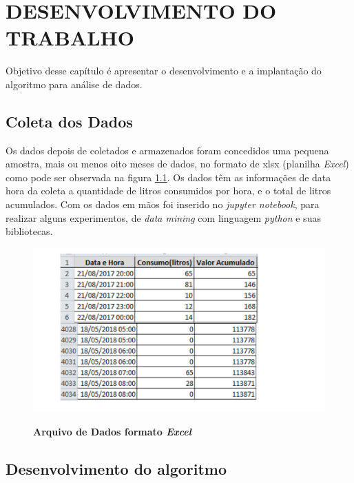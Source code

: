 	\newpage
\chapter{DESENVOLVIMENTO DO TRABALHO}

\par Objetivo desse capítulo é apresentar o desenvolvimento e a implantação do algoritmo para análise de dados.



\section{Coleta dos Dados}

\par Os dados depois de coletados e armazenados foram concedidos uma pequena amostra, mais ou menos oito meses de dados, no formato de xlsx (planilha \emph{Excel}) como pode ser observada na figura \ref{arquivo_de_dados}. Os dados têm  as informações de data hora da coleta a quantidade de litros consumidos por hora, e o total de litros acumulados. Com os dados em mãos foi inserido no \emph{jupyter notebook}, para realizar alguns experimentos, de \emph{data mining} com linguagem \emph{python} e suas bibliotecas.

\begin{figure}[ht]
	\caption{\textbf{Arquivo de Dados formato \emph{Excel}}}
	\centering
		\includegraphics[width=\textwidth,height=\textheight, keepaspectratio]{figuras/planilhaexceldosdados3.png}
		\label{arquivo_de_dados}
\end{figure}


\section{Desenvolvimento do algoritmo}

